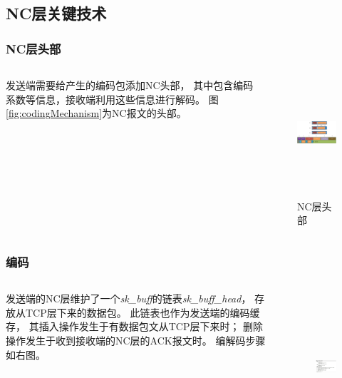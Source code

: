 \subsection{NC层关键技术}
\begin{frame}
	\frametitle{NC层头部}
	\begin{columns}
		\begin{column}{0.4\textwidth}
			发送端需要给产生的编码包添加NC头部，
			其中包含编码系数等信息，接收端利用这些信息进行解码。
			图\ref{fig:codingMechanism}为NC报文的头部。
		\end{column}
		\begin{column}{0.6\textwidth}
			\begin{figure}
				\includegraphics[height=4cm]{../figures/codingheader.eps}
				\label{fig:codingheader}
				\caption{NC层头部}
			\end{figure}
		\end{column}
	\end{columns}
	\note{
	}
\end{frame}
\begin{frame}
	\frametitle{编码}
	\begin{columns}
		\begin{column}{0.4\textwidth}
			发送端的NC层维护了一个\emph{sk\_buff}的链表\emph{sk\_buff\_head}，
			存放从TCP层下来的数据包。
			此链表也作为发送端的编码缓存，
			其插入操作发生于有数据包文从TCP层下来时；
			删除操作发生于收到接收端的NC层的ACK报文时。
			编解码步骤如右图。
		\end{column}
		\begin{column}{0.6\textwidth}
			\vspace{-2.5em}
			\begin{figure}
				\includegraphics[height=5.5cm]{figures/encoding.jpg}
			\end{figure}
		\end{column}
	\end{columns}
\end{frame}


